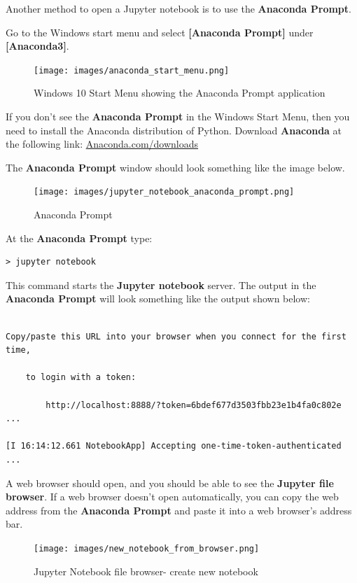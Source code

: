 \documentclass{book}
\begin{document}
    
        Another method to open a Jupyter notebook is to use the \textbf{Anaconda
Prompt}.

Go to the Windows start menu and select \textbf{{[}Anaconda Prompt{]}}
under \textbf{{[}Anaconda3{]}}.

\begin{figure}
\centering
\texttt{[image: images/anaconda\_start\_menu.png]}
\caption{Windows 10 Start Menu showing the Anaconda Prompt application}
\end{figure}

If you don't see the \textbf{Anaconda Prompt} in the Windows Start Menu,
then you need to install the Anaconda distribution of Python. Download
\textbf{Anaconda} at the following link:
\href{https://www.anaconda.com/download/}{Anaconda.com/downloads}

The \textbf{Anaconda Prompt} window should look something like the image
below.

\begin{figure}
\centering
\texttt{[image: images/jupyter\_notebook\_anaconda\_prompt.png]}
\caption{Anaconda Prompt}
\end{figure}

At the \textbf{Anaconda Prompt} type:

\begin{lstlisting}
> jupyter notebook
\end{lstlisting}

This command starts the \textbf{Jupyter notebook} server. The output in
the \textbf{Anaconda Prompt} will look something like the output shown
below:

\begin{lstlisting}

Copy/paste this URL into your browser when you connect for the first time,

    to login with a token:

        http://localhost:8888/?token=6bdef677d3503fbb23e1b4fa0c802e ...

[I 16:14:12.661 NotebookApp] Accepting one-time-token-authenticated ...
\end{lstlisting}

A web browser should open, and you should be able to see the
\textbf{Jupyter file browser}. If a web browser doesn't open
automatically, you can copy the web address from the \textbf{Anaconda
Prompt} and paste it into a web browser's address bar.

\begin{figure}
\centering
\texttt{[image: images/new\_notebook\_from\_browser.png]}
\caption{Jupyter Notebook file browser- create new notebook}
\end{figure}
\end{document}
